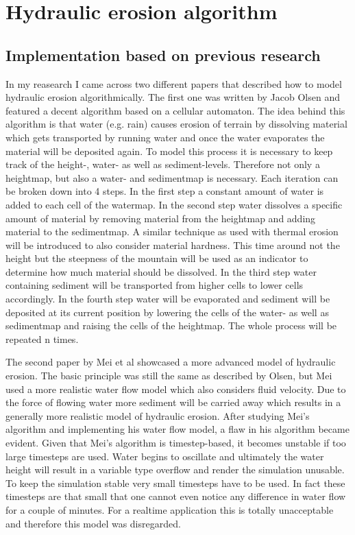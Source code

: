 \documentclass[11pt,a4paper,twoside,openright]{report}
\begin{document}
\section{Hydraulic erosion algorithm}
\subsection{Implementation based on previous research}
In my reasearch I came across two different papers that described how to model hydraulic erosion algorithmically. The first one \cite{Olsen:2004} was written by Jacob Olsen and featured a decent algorithm based on a cellular automaton. The idea behind this algorithm is that water (e.g. rain) causes erosion of terrain by dissolving material which gets transported by running water and once the water evaporates the material will be deposited again. To model this process it is necessary to keep track of the height-, water- as well as sediment-levels. Therefore not only a heightmap, but also a water- and sedimentmap is necessary. Each iteration can be broken down into 4 steps. In the first step a constant amount of water is added to each cell of the watermap. In the second step water dissolves a specific amount of material by removing material from the heightmap and adding material to the sedimentmap. A similar technique as used with thermal erosion will be introduced to also consider material hardness. This time around not the height but the steepness of the mountain will be used as an indicator to determine how much material should be dissolved. In the third step water containing sediment will be transported from higher cells to lower cells accordingly. In the fourth step water will be evaporated and sediment will be deposited at its current position by lowering the cells of the water- as well as sedimentmap and raising the cells of the heightmap. The whole process will be repeated n times.

The second paper \cite{mei:inria-00402079} by Mei et al showcased a more advanced model of hydraulic erosion. The basic principle was still the same as described by Olsen, but Mei used a more realistic water flow model which also considers fluid velocity. Due to the force of flowing water more sediment will be carried away which results in a generally more realistic model of hydraulic erosion. After studying Mei's algorithm and implementing his water flow model, a flaw in his algorithm became evident. Given that Mei's algorithm is timestep-based, it becomes unstable if too large timesteps are used. Water begins to oscillate and ultimately the water height will result in a variable type overflow and render the simulation unusable. To keep the simulation stable very small timesteps have to be used. In fact these timesteps are that small that one cannot even notice any difference in water flow for a couple of minutes. For a realtime application this is totally unacceptable and therefore this model was disregarded.
\end{document}
